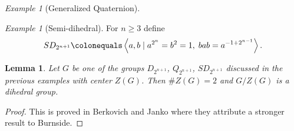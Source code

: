 \documentclass{dcthesis}
\newcommand{\mm}[1]{{\color{blue} \sf MM: [#1]}}
\numberwithin{equation}{section}
\newtheorem{lemma}[equation]{Lemma}
\theoremstyle{definition}
\theoremstyle{remark}
\newtheorem{example}[equation]{Example}
\begin{document}
{{{\begin{example}[Generalized Quaternion]
    \end{example}
    \begin{example}[Semi-dihedral]
      \label{exm:semidihedral}
      For $n\geq 3$ define
      \begin{equation}
        \label{eqn:semidehedralpresentation}
        SD_{2^{n+1}}
        \colonequals
        \left\langle
          a,b\mid
          a^{2^{n}}=b^2=1,\;
          bab=a^{-1+2^{n-1}}
        \right\rangle.
      \end{equation}
    \end{example}
    \begin{lemma}
      \label{lem:dihedralquotient}
      Let $G$ be one of the groups
      $D_{2^{n+1}}$, $Q_{2^{n+1}}$, $SD_{2^{n+1}}$
      discussed in the previous examples
      with center $Z(G)$.
      Then $\#Z(G) = 2$
      and $G/Z(G)$ is a dihedral group.
    \end{lemma}
    \begin{proof}
      This is proved in
      Berkovich and Janko
      \cite[Theorem 1.2]{berkovich1}
      where they attribute a stronger result
      to Burnside.
    \end{proof}
  }
}}
\end{document}
